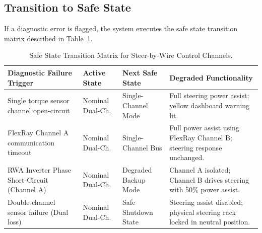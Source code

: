 \subsection{Transition to Safe State}
If a diagnostic error is flagged, the system executes the safe state transition matrix described in Table~\ref{tab:safestate}.

\begin{table}[H]
    \centering
    \small
    \caption{Safe State Transition Matrix for Steer-by-Wire Control Channels.}
    \label{tab:safestate}
    \begin{tabularx}{\linewidth}{X l l p{3.8cm}}
        \toprule
        \textbf{Diagnostic Failure Trigger} & \textbf{Active State} & \textbf{Next Safe State} & \textbf{Degraded Functionality} \\
        \midrule
        Single torque sensor channel open-circuit & Nominal Dual-Ch. & Single-Channel Mode & Full steering power assist; yellow dashboard warning lit. \\
        FlexRay Channel A communication timeout & Nominal Dual-Ch. & Single-Channel Bus & Full power assist using FlexRay Channel B; steering response unchanged. \\
        RWA Inverter Phase Short-Circuit (Channel A) & Nominal Dual-Ch. & Degraded Backup Mode & Channel A isolated; Channel B drives steering with 50\% power assist. \\
        Double-channel sensor failure (Dual loss) & Nominal Dual-Ch. & Safe Shutdown State & Steering assist disabled; physical steering rack locked in neutral position. \\
        \bottomrule
    \end{tabularx}
\end{table}
